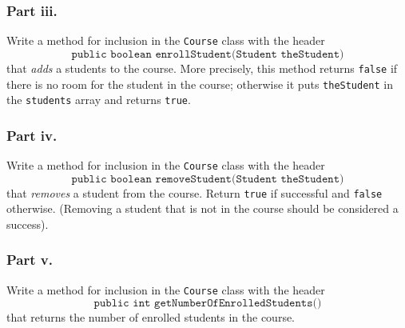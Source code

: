 \AnsBox{17cm}

\subsubsection*{Part iii.}
Write a method for inclusion in the \texttt{Course} class with the header 
$$ \texttt{ public boolean enrollStudent(Student theStudent) } $$
that \emph{adds} a students to the course. More precisely, this method returns \texttt{false} if there is no room for the student in the course; otherwise it puts \texttt{theStudent} in the \texttt{students} array and returns \texttt{true}.
\\

\AnsBox{18cm} \clearpage

\subsubsection*{Part iv.}
Write a method for inclusion in the \texttt{Course} class with the header 
$$ \texttt{ public boolean removeStudent(Student theStudent) } $$
that \emph{removes} a student from the course. Return \texttt{true} if successful and \texttt{false} otherwise. (Removing a student that is not in the course should be considered a success).\\

\AnsBox{18cm} \clearpage

\subsubsection*{Part v.}
Write a method for inclusion in the \texttt{Course} class with the header 
$$ \texttt{ public int getNumberOfEnrolledStudents() } $$
that returns the number of enrolled students in the course.\\

\AnsBox{19cm} \clearpage